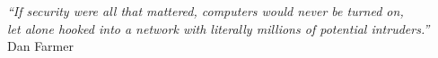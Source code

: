 \cleardoublepage
\thispagestyle{plain}

\vspace*{8cm}

\begin{flushright}
   \textsl{``If security were all that mattered, computers would never be turned on,\\
             let alone hooked into a network with literally millions of potential intruders.''} \\
\vspace*{1.5cm}
           Dan Farmer
\end{flushright}